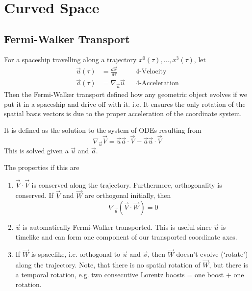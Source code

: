 \setchapterpreamble[u]{\margintoc}
\chapter{Curved Space}


\section{Fermi-Walker Transport}
For a spaceship travelling along a trajectory $x^0(\tau), \dots, x^3(\tau)$, let 
\begin{align*}
    \vec{u}(\tau) & = \frac{d\vec{x}}{d\tau} && \text{4-Velocity} \\
    \vec{a}(\tau) & = \nabla_{\vec{u}} \vec{u} && \text{4-Acceleration}
\end{align*}
Then the Fermi-Walker transport defined how any geometric object evolves if we put it in a spaceship and drive off with it. i.e. It ensures the only rotation of the spatial basis vectors is due to the proper acceleration of the coordinate system. \par It is defined as the solution to the system of ODEs resulting from
$$ \nabla_{\vec{u}} \vec{V} = \vec{u}\vec{a} \cdot \vec{V} - \vec{a}\vec{u} \cdot \vec{V} $$
This is solved given a $\vec{u}$ and $\vec{a}$. \par The properties if this are
\begin{enumerate}
    \item $\vec{V} \cdot \vec{V}$ is conserved along the trajectory. Furthermore, orthogonality is conserved. If $\vec{V}$ and $\vec{W}$ are orthogonal initially, then
    $$ \nabla_{\vec{u}} (\vec{V} \cdot \vec{W}) = 0 $$
    \item $\vec{u}$ is automatically Fermi-Walker transported. This is useful since $\vec{u}$ is timelike and can form one component of our transported coordinate axes.
    \item If $\vec{W}$ is spacelike, i.e. orthogonal to $\vec{u}$ and $\vec{a}$, then $\vec{W}$ doesn't evolve (`rotate') along the trajectory. Note, that there is no spatial rotation of $\vec{W}$, but there is a temporal rotation, e.g. two consecutive Lorentz boosts = one boost + one rotation.
\end{enumerate}

